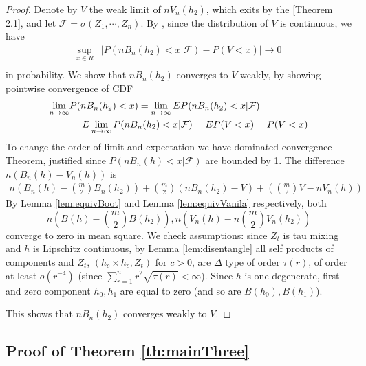 \begin{proof}
Denote by $V$ the weak limit of $n V_n(h_2)$, which exits by the  \cite{leucht_dependent_2013}[Theorem 2.1],  and let $\mathcal{F} = \sigma(Z_1, \cdots , Z_n)$.   By \cite[Theorem 3.1]{leucht_dependent_2013}, since the distribution of  $V$ is continuous, we have 
\begin{align*}
\sup_{x \in R} &\left| P(nB_n(h_2)  < x|\mathcal{F}) -   P(V<x) \right| \to 0  \\
\end{align*}
in probability. We show that $nB_n(h_2)$ converges  to $V$ weakly, by showing  pointwise convergence  of CDF  
\begin{align*}
 \lim_{n \to \infty} &P(nB_n(h_2)  < x) =  \lim_{n \to \infty} E P(nB_n(h_2)  < x|\mathcal{F}) \\
 &=  E  \lim_{n \to \infty} P(nB_n(h_2)  < x|\mathcal{F})  = E P(V<x) =P(V<x) 
\end{align*}
To change the order of limit and expectation we have dominated convergence Theorem, justified since  $P(nB_n(h)  < x|\mathcal{F})$  are bounded by 1.
The difference $n(B_n(h) - V_n(h))$ is
\begin{align*}
 n \left (B_n(h) -  \binom m 2 B_n(h_2) \right) + \binom m 2 \left (n B_n(h_2) -V\right)+ \left (\binom m 2 V - nV_n(h)\right)
 \end{align*}
By  Lemma \ref{lem:equivBoot} and Lemma \ref{lem:equivVanila} respectively, both 
$$n (B(h) -   \binom m 2  B(h_2)) , n (V_n(h) - n \binom m 2 V_n(h_2))$$
converge to zero in mean square. We check assumptions: since $Z_t$ is tau mixing and $h$ is Lipschitz continuous, by Lemma \ref{lem:disentangle} all self products of components and $Z_t$, $(h_c \times h_c,Z_t)$ for $c>0$, are $\varDelta$ type of order $\tau(r)$, of order at least  $o(r^{-4})$ (since $\sum_{r=1}^n r^2 \sqrt{\tau(r)} < \infty$). Since $h$ is one degenerate,  first and zero component $h_0,h_1$ are equal to zero (and so are $B(h_0),B(h_1)$).  

This shows that $nB_n(h_2)$ converges weakly to $V$. 
\end{proof}  

\subsection{Proof of Theorem \ref{th:mainThree}}

